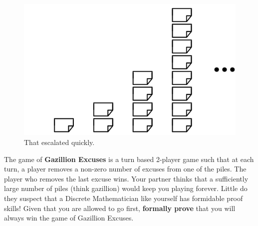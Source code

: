 \documentclass[addpoints]{exam}
\begin{document}
\begin{questions}
\begin{figure}[ht]
  \centering
  \includegraphics{excuses.png}
  \caption{That escalated quickly.}
  \label{fig:Piles of excuses}
\end{figure}

The game of \textbf{Gazillion Excuses} is a turn based 2-player game such that at each turn, a player removes a non-zero number of excuses from one of the piles. The player who removes the last excuse wins. Your partner thinks that a sufficiently large number of piles (think gazillion) would keep you playing forever. Little do they suspect that a Discrete Mathematician like yourself has formidable proof skills! Given that you are allowed to go first, \textbf{formally prove} that you will always win the game of Gazillion Excuses. 



\end{questions}
\end{document}
